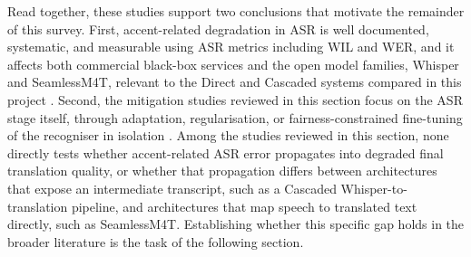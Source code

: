 Read together, these studies support two conclusions that motivate the
remainder of this survey. First, accent-related degradation in ASR is well
documented, systematic, and measurable using ASR metrics including WIL and
WER, and it affects both commercial black-box services and the open model
families, Whisper and SeamlessM4T, relevant to the Direct and Cascaded systems
compared in this project
\cite{dichristofano2022global,jahan2025unveiling,swain2026fair}. Second, the
mitigation studies reviewed in this section focus on the ASR stage itself,
through adaptation, regularisation, or fairness-constrained fine-tuning of the
recogniser in isolation
\cite{prabhu2023accentcodebooks,swain2026fair,thai2026contrastive}. Among the
studies reviewed in this section, none directly tests whether accent-related
ASR error propagates into degraded final translation quality, or whether that
propagation differs between architectures that expose an intermediate
transcript, such as a Cascaded Whisper-to-translation pipeline, and
architectures that map speech to translated text directly, such as
SeamlessM4T. Establishing whether this specific gap holds in the broader
literature is the task of the following section.
